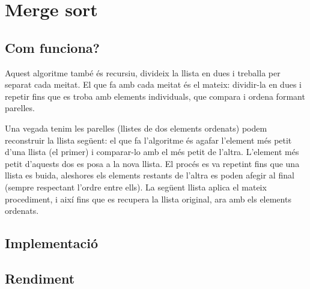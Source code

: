 \chapter{Merge sort}

\section{Com funciona?}
Aquest algoritme també és recursiu, divideix la llista en dues i treballa per separat cada meitat. El que fa amb cada meitat és el mateix: dividir-la en dues i repetir fins que es troba amb elements individuals, que compara i ordena formant parelles.

Una vegada tenim les parelles (llistes de dos elements ordenats) podem reconstruir la llista següent: el que fa l'algoritme és agafar l'element més petit d'una llista (el primer) i comparar-lo amb el més petit de l'altra. L'element més petit d'aquests dos es posa a la nova llista. El procés es va repetint fins que una llista es buida, aleshores els elements restants de l'altra es poden afegir al final (sempre respectant l'ordre entre ells).
La següent llista aplica el mateix procediment, i així fins que es recupera la llista original, ara amb els elements ordenats.

\section{Implementació}


\begin{minipage}{\textwidth}
	\section{Rendiment}
	\noindent
	\makebox[\textwidth][c]{
		
	}
	\vspace*{1em}
	\begin{center}
		\resizebox{\textwidth}{!}{}
	\end{center}
\end{minipage}